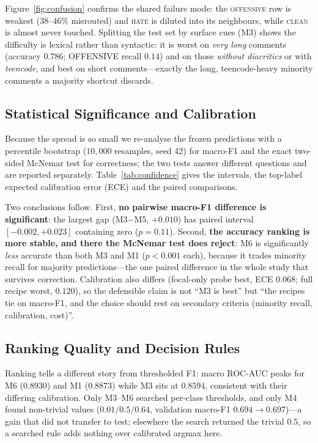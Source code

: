 Figure~\ref{fig:confusion} confirms the shared failure mode: the
\textsc{offensive} row is weakest ($38$--$46\%$ misrouted) and \textsc{hate} is
diluted into its neighbours, while \textsc{clean} is almost never touched.
Splitting the test set by surface cues (M3) shows the difficulty is lexical
rather than syntactic: it is worst on \emph{very long} comments (accuracy $0.786$;
OFFENSIVE recall $0.14$) and on those \emph{without diacritics} or with
\emph{teencode}, and best on short comments---exactly the long, teencode-heavy
minority comments a majority shortcut discards.

\subsection{Statistical Significance and Calibration}
\label{sec:significance}
Because the spread is so small we re-analyse the frozen predictions with a
percentile bootstrap ($10{,}000$ resamples, seed 42) for macro-F1 and the exact
two-sided McNemar test for correctness; the two tests answer different questions
and are reported separately.  Table~\ref{tab:confidence} gives the intervals, the
top-label expected calibration error (ECE) and the paired comparisons.



Two conclusions follow.  First, \textbf{no pairwise macro-F1 difference is
significant}: the largest gap (M3$-$M5, $+0.010$) has paired interval
$[-0.002,+0.023]$ containing zero ($p=0.11$).  Second, \textbf{the accuracy ranking
is more stable, and there the McNemar test does reject}: M6 is significantly
\emph{less} accurate than both M3 and M1 ($p<0.001$ each), because it trades
minority recall for majority predictions---the one paired difference in the whole
study that survives correction.  Calibration also differs (focal-only probe best,
ECE $0.068$; full recipe worst, $0.120$), so the defensible claim is not ``M3 is
best'' but ``the recipes tie on macro-F1, and the choice should rest on secondary
criteria (minority recall, calibration, cost)''.

\subsection{Ranking Quality and Decision Rules}
Ranking tells a different story from thresholded F1: macro ROC-AUC peaks for M6
($0.8930$) and M1 ($0.8873$) while M3 sits at $0.8594$, consistent with their
differing calibration.  Only M3--M6 searched per-class thresholds, and only M4
found non-trivial values ($0.01/0.5/0.64$, validation macro-F1 $0.694\to0.697$)---a
gain that did not transfer to test; elsewhere the search returned the trivial
$0.5$, so a searched rule adds nothing over calibrated argmax here.

